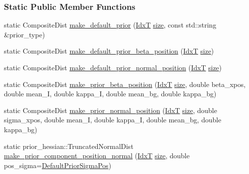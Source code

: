 \subsubsection*{Static Public Member Functions}
\begin{DoxyCompactItemize}
\item 
static Composite\+Dist \hyperlink{classmappel_1_1Gauss1DModel_ab9aeff0d5e4f065e81b1d49183ca3fcb}{make\+\_\+default\+\_\+prior} (\hyperlink{namespacemappel_ab17ec0f30b61ece292439d7ece81d3a8}{IdxT} \hyperlink{classmappel_1_1ImageFormat1DBase_a8941b4d028e4dd881146a7c1b9039bb1}{size}, const std\+::string \&prior\+\_\+type)
\item 
static Composite\+Dist \hyperlink{classmappel_1_1Gauss1DModel_a539665592706f1d18966ce7fff974f92}{make\+\_\+default\+\_\+prior\+\_\+beta\+\_\+position} (\hyperlink{namespacemappel_ab17ec0f30b61ece292439d7ece81d3a8}{IdxT} \hyperlink{classmappel_1_1ImageFormat1DBase_a8941b4d028e4dd881146a7c1b9039bb1}{size})
\item 
static Composite\+Dist \hyperlink{classmappel_1_1Gauss1DModel_a456b984f2309b0d5a72516361e4e18d0}{make\+\_\+default\+\_\+prior\+\_\+normal\+\_\+position} (\hyperlink{namespacemappel_ab17ec0f30b61ece292439d7ece81d3a8}{IdxT} \hyperlink{classmappel_1_1ImageFormat1DBase_a8941b4d028e4dd881146a7c1b9039bb1}{size})
\item 
static Composite\+Dist \hyperlink{classmappel_1_1Gauss1DModel_a808fde22a0fb00140b4ba60e7df685eb}{make\+\_\+prior\+\_\+beta\+\_\+position} (\hyperlink{namespacemappel_ab17ec0f30b61ece292439d7ece81d3a8}{IdxT} \hyperlink{classmappel_1_1ImageFormat1DBase_a8941b4d028e4dd881146a7c1b9039bb1}{size}, double beta\+\_\+xpos, double mean\+\_\+I, double kappa\+\_\+I, double mean\+\_\+bg, double kappa\+\_\+bg)
\item 
static Composite\+Dist \hyperlink{classmappel_1_1Gauss1DModel_ab4fc9aafd94b2dd6532ef71f2ea47619}{make\+\_\+prior\+\_\+normal\+\_\+position} (\hyperlink{namespacemappel_ab17ec0f30b61ece292439d7ece81d3a8}{IdxT} \hyperlink{classmappel_1_1ImageFormat1DBase_a8941b4d028e4dd881146a7c1b9039bb1}{size}, double sigma\+\_\+xpos, double mean\+\_\+I, double kappa\+\_\+I, double mean\+\_\+bg, double kappa\+\_\+bg)
\item 
static prior\+\_\+hessian\+::\+Truncated\+Normal\+Dist \hyperlink{classmappel_1_1PointEmitterModel_a70b1a5c81d227dce0ffb5910ffbf7387}{make\+\_\+prior\+\_\+component\+\_\+position\+\_\+normal} (\hyperlink{namespacemappel_ab17ec0f30b61ece292439d7ece81d3a8}{IdxT} \hyperlink{classmappel_1_1ImageFormat1DBase_a8941b4d028e4dd881146a7c1b9039bb1}{size}, double pos\+\_\+sigma=\hyperlink{classmappel_1_1PointEmitterModel_a38b73a91eaae7b5fd0977b88ea844280}{Default\+Prior\+Sigma\+Pos})

\end{DoxyCompactItemize}
